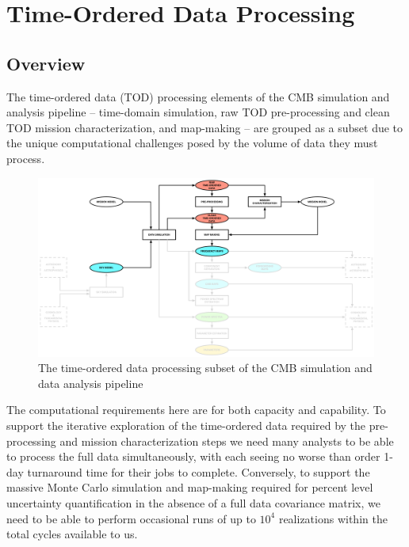 
\section{Time-Ordered Data Processing}

\subsection{Overview}

The time-ordered data (TOD) processing elements of the CMB simulation and analysis pipeline -- time-domain simulation, raw TOD pre-processing and clean TOD mission characterization, and map-making -- are grouped as a subset due to the unique computational challenges posed by the volume of data they must process.

\begin{figure}[htbp]
\centering
\includegraphics[width=1\textwidth]{Analysis/td}
\caption{The time-ordered data processing subset of the CMB simulation and data analysis pipeline}
\label{fig_td}
\end{figure}





The computational requirements here are for both capacity and capability. To support the iterative exploration of the time-ordered data required by the pre-processing and mission characterization steps we need many analysts to be able to process the full data simultaneously, with each seeing no worse than order 1-day turnaround time for their jobs to complete. Conversely, to support the massive Monte Carlo simulation and map-making required for percent level uncertainty quantification in the absence of a full data covariance matrix, we need to be able to perform occasional runs of up to $10^4$ realizations within the total cycles available to us.



